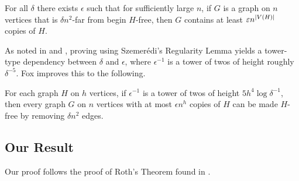 \begin{lemma}\label{lem:graph-removal-1}
	For all $\delta$ there exists $\epsilon$ such that for sufficiently large $n$, if $G$ is a graph on $n$ vertices that is $\delta n^2$-far from begin $H$-free, then $G$ contains at least $\varepsilon n^{\left\vert{V(H)}\right\vert}$ copies of $H$.
\end{lemma}
As noted in \cite{Lee15} and \cite{Fox11}, proving  using Szemer\'edi's Regularity Lemma yields a tower-type dependency between $\delta$ and $\epsilon$, where $\epsilon^{-1}$ is a tower of twos of height roughly $\delta^{-5}$. Fox improves this to the following.

\begin{lemma}
	For each graph $H$ on $h$ vertices, if $\epsilon^{-1}$ is a tower of twos of height $5h^4\log \delta^{-1}$, then every graph $G$ on $n$ vertices with at most $\epsilon n^h$ copies of $H$ can be made $H$-free by removing $\delta n^2$ edges.
\end{lemma}

\subsection{Our Result}
Our proof follows the proof of Roth's Theorem found in \cite{Lee15}.

